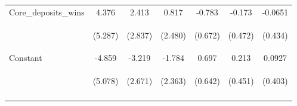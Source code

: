 \begin{tabular}{lcccccc}
Core\_deposits\_wins & 4.376 & 2.413 & 0.817 & -0.783 & -0.173 & -0.0651 \\
\vspace{4pt} & \begin{footnotesize}(5.287)\end{footnotesize} & \begin{footnotesize}(2.837)\end{footnotesize} & \begin{footnotesize}(2.480)\end{footnotesize} & \begin{footnotesize}(0.672)\end{footnotesize} & \begin{footnotesize}(0.472)\end{footnotesize} & \begin{footnotesize}(0.434)\end{footnotesize} \\
Constant & -4.859 & -3.219 & -1.784 & 0.697 & 0.213 & 0.0927 \\
 & \begin{footnotesize}(5.078)\end{footnotesize} & \begin{footnotesize}(2.671)\end{footnotesize} & \begin{footnotesize}(2.363)\end{footnotesize} & \begin{footnotesize}(0.642)\end{footnotesize} & \begin{footnotesize}(0.451)\end{footnotesize} & \begin{footnotesize}(0.403)\end{footnotesize} \\
\vspace{4pt} & \begin{footnotesize}\end{footnotesize} & \begin{footnotesize}\end{footnotesize} & \begin{footnotesize}\end{footnotesize} & \begin{footnotesize}\end{footnotesize} & \begin{footnotesize}\end{footnotesize} & \begin{footnotesize}\end{footnotesize} \\

\end{tabular}
